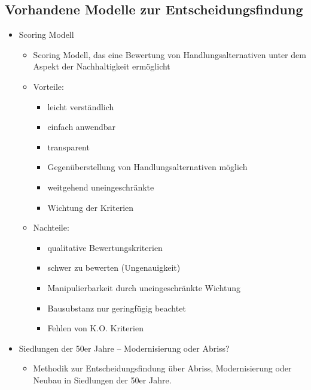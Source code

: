 \documentclass[fleqn,twoside,dvipsnames]{article}
\begin{document}
    \subsection{Vorhandene Modelle zur Entscheidungsfindung}
        \begin{itemize}
            \item Scoring Modell
                \begin{itemize}
                    \item Scoring Modell, das eine Bewertung von Handlungsalternativen unter dem Aspekt der Nachhaltigkeit ermöglicht
                    \item Vorteile: 
                        \begin{itemize}
                            \item leicht verständlich
                            \item einfach anwendbar
                            \item transparent
                            \item Gegenüberstellung von Handlungsalternativen möglich
                            \item weitgehend uneingeschränkte
                            \item Wichtung der Kriterien
                        \end{itemize}
                    \item Nachteile:
                        \begin{itemize}
                            \item qualitative Bewertungskriterien
                            \item schwer zu bewerten (Ungenauigkeit)
                            \item Manipulierbarkeit durch uneingeschränkte Wichtung
                            \item Bausubstanz nur geringfügig beachtet
                            \item Fehlen von K.O. Kriterien
                        \end{itemize}
                \end{itemize}
            \item Siedlungen der 50er Jahre – Modernisierung oder Abriss?
                \begin{itemize}
                    \item Methodik zur Entscheidungsfindung über Abriss, Modernisierung oder Neubau in Siedlungen der 50er Jahre.\\

\end{itemize}
\end{itemize}
\end{document}
